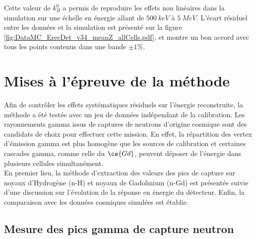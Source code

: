 Cette valeur de $k_B^0$ a permis de reproduire les effets non linéaires dans la simulation sur une échelle en énergie allant de $\SI{500}{keV}$ à $\SI{5}{MeV}$. L'écart résiduel entre les données et la simulation est présenté sur la figure \ref{fig:DataMC_ErecDet_v34_meanZ_allCells.pdf}, et montre un bon accord avec tous les points contenus dans une bande $\pm 1\%$.\\

\bigbreak

%
%
%

\section{Mises à l'épreuve de la méthode}
\label{seq:erec_crosscheck}

Afin de contrôler les effets systématiques résiduels sur l'énergie reconstruite, la méthode a été testée avec un jeu de données indépendant de la calibration. Les rayonnements gamma issus de captures de neutrons d'origine cosmique sont des candidats de choix pour effectuer cette mission. En effet, la répartition des vertex d'émission gamma est plus homogène que les sources de calibration et certaines cascades gamma, comme celle du $\ce{Gd}$, peuvent déposer de l'énergie dans plusieurs cellules simultanément.\\

En premier lieu, la méthode d'extraction des valeurs des pics de capture sur noyaux d'Hydrogène (n-H) et noyaux de Gadolinium (n-Gd) est présentée suivie d'une discussion sur l'évolution de la réponse en énergie du détecteur. Enfin, la comparaison avec les données cosmiques simulées est établie.\\

\subsection{Mesure des pics gamma de capture neutron}
\label{sec:pic_gamma_nH}

